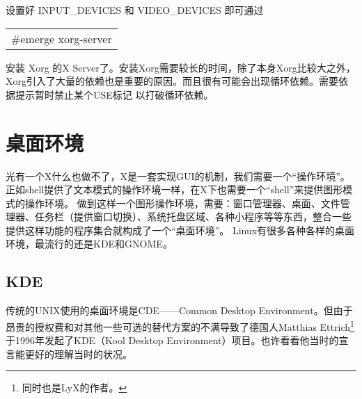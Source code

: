 \documentclass[amstex,twoside]{ctexbook}
\newenvironment{code}{\small\tt\begin{longtable}{p{0.8\textwidth}}}{\end{longtable}}
\begin{document}
设置好  INPUT\_DEVICES 和 VIDEO\_DEVICES 即可通过

\begin{code}
\#emerge xorg-server
\end{code}

安装 Xorg 的X Server了。安装Xorg需要较长的时间，除了本身Xorg比较大之外，Xorg引入了大量的依赖也是重要的原因。而且很有可能会出现循环依赖。需要依据提示暂时禁止某个USE标记
以打破循环依赖。

\section{桌面环境}

光有一个X什么也做不了，X是一套实现GUI的机制，我们需要一个“操作环境”。正如shell提供了文本模式的操作环境一样，在X下也需要一个“shell”来提供图形模式的操作环境。
做到这样一个图形操作环境，需要：窗口管理器、桌面、文件管理器、任务栏（提供窗口切换）、系统托盘区域、各种小程序等等东西，整合一些提供这样功能的程序集合就构成了一个“桌面环境”。
Linux有很多各种各样的桌面环境，最流行的还是KDE和GNOME。

\subsection{KDE}

传统的UNIX使用的桌面环境是CDE——Common Desktop Environment。但由于昂贵的授权费和对其他一些可选的替代方案的不满导致了德国人Matthias Ettrich\footnote{同时也是LyX的作者。}于1996年发起了KDE（Kool Desktop Environment）项目。也许看看他当时的宣言能更好的理解当时的状况。
\end{document}
